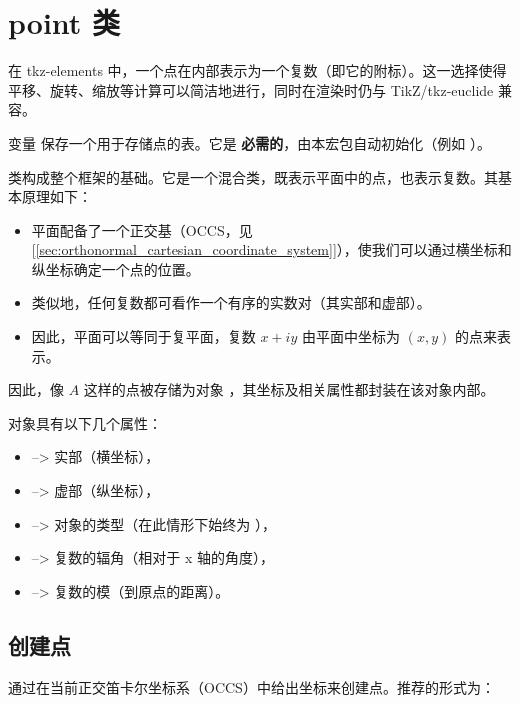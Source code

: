 \newpage

\section{point 类}
在 tkz-elements 中，一个点在内部表示为一个复数（即它的附标）。这一选择使得平移、旋转、缩放等计算可以简洁地进行，同时在渲染时仍与 TikZ/tkz-euclide 兼容。


变量  保存一个用于存储点的表。它是 \textbf{必需的}，由本宏包自动初始化（例如 ）。


\vspace{1em}
 类构成整个框架的基础。它是一个混合类，既表示平面中的点，也表示复数。其基本原理如下：

\begin{itemize}
  \item 平面配备了一个正交基（OCCS，见 [\ref{sec:orthonormal_cartesian_coordinate_system}]），使我们可以通过横坐标和纵坐标确定一个点的位置。
  \item 类似地，任何复数都可看作一个有序的实数对（其实部和虚部）。
  \item 因此，平面可以等同于复平面，复数 $x + iy$ 由平面中坐标为 $(x, y)$ 的点来表示。
\end{itemize}

因此，像 $A$ 这样的点被存储为对象 ，其坐标及相关属性都封装在该对象内部。

\vspace{1em}
 对象具有以下几个属性：
\begin{mybox}{}
\begin{itemize}
  \item {} --> 实部（横坐标），
  \item {} --> 虚部（纵坐标），
  \item {} --> 对象的类型（在此情形下始终为 ），
  \item {} --> 复数的辐角（相对于 x 轴的角度），
  \item {} --> 复数的模（到原点的距离）。
\end{itemize}
\end{mybox}



\subsection{创建点}
\label{sub:creating_a_point}

通过在当前正交笛卡尔坐标系（OCCS）中给出坐标来创建点。推荐的形式为：

